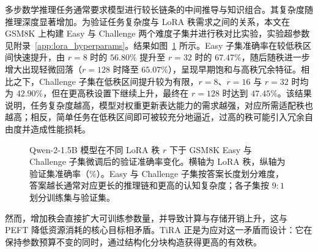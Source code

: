 \documentclass[UTF8,a4paper,11pt]{ctexart}
\begin{document}
多步数学推理任务通常要求模型进行较长链条的中间推导\cite{wei2022cot,kojima2022zero}与知识组合。其复杂度随推理深度显著增加。为验证任务复杂度与 LoRA 秩需求之间的关系，本文在 GSM8K\cite{cobbe2021gsm8k} 上构建 Easy 与 Challenge 两个难度子集并进行秩对比实验，实验超参数见附录~\ref{app:lora_hyperparams}。结果如图~\ref{fig:rank_motivation} 所示。Easy 子集准确率在较低秩区间快速提升，由 $r=8$ 时的 $56.80\%$ 提升至 $r=32$ 时的 $67.47\%$，随后随秩进一步增大出现轻微回落（$r=128$ 时降至 $65.07\%$），呈现早期饱和与高秩冗余特征。相比之下，Challenge 子集在低秩区间提升较为有限，$r=8$、$r=16$ 与 $r=32$ 时均为 $42.90\%$，但在更高秩设置下继续上升，最终在 $r=128$ 时达到 $47.45\%$。该结果说明，任务复杂度越高，模型对权重更新表达能力的需求越强，对应所需适配秩也越高；相反，简单任务在低秩区间即可被较充分地逼近，过高的秩可能引入冗余自由度并造成性能损耗。

\begin{figure}[H]
    \centering
    \caption{Qwen-2-1.5B 模型在不同 LoRA 秩 $r$ 下于 GSM8K Easy 与 Challenge 子集微调后的验证准确率变化。横轴为 LoRA 秩，纵轴为验证集准确率（\%）。Easy 与 Challenge 子集按答案长度划分难度，答案越长通常对应更长的推理链和更高的认知复杂度；各子集按 $9:1$ 划分训练集与验证集。}
    \label{fig:rank_motivation}
\end{figure}

然而，增加秩会直接扩大可训练参数量，并导致计算与存储开销上升，这与 PEFT 降低资源消耗的核心目标相矛盾。TiRA 正是为应对这一矛盾而设计：它在保持参数预算不变的同时，通过结构化分块构造获得更高的有效秩。
\end{document}
